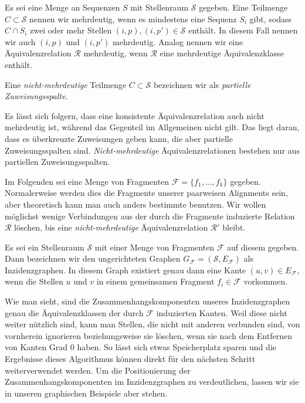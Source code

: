 \begin{definition}
	Es sei eine Menge an Sequenzen $S$ mit Stellenraum $\mathcal{S}$ gegeben. Eine Teilmenge $C \subset \mathcal{S}$ nennen wir mehrdeutig, wenn es mindestens eine Sequenz $S_i$ gibt, sodass $C \cap S_i$ zwei oder mehr Stellen $(i,p), (i,p') \in \mathcal{S}$ enthält. In diesem Fall nennen wir auch $(i,p)$ und $(i,p')$ mehrdeutig. Analog nennen wir eine Äquivalenzrelation $\mathcal{R}$ mehrdeutig, wenn $\mathcal{R}$ eine mehrdeutige Äquivalenzklasse enthält.
	
	Eine \emph{nicht-mehrdeutige} Teilmenge $C \subset \mathcal{S}$ bezeichnen wir als \emph{partielle Zuweisungsspalte}.
\end{definition}

Es lässt sich folgern, dass eine konsistente Äquivalenzrelation auch nicht mehrdeutig ist, während das Gegenteil im Allgemeinen nicht gilt. Das liegt daran, dass es überkreuzte Zuweisungen geben kann, die aber partielle Zuweisungsspalten sind. \emph{Nicht-mehrdeutige} Äquivalenzrelationen bestehen nur aus partiellen Zuweisungsspalten.

Im Folgenden sei eine Menge von Fragmenten $\mathcal{F} = \{f_1, \dots, f_k\}$ gegeben. Normalerweise werden dies die Fragmente unserer paarweisen Alignments sein, aber theoretisch kann man auch anders bestimmte benutzen. Wir wollen möglichst wenige Verbindungen aus der durch die Fragmente induzierte Relation $\mathcal{R}$ löschen, bis eine \emph{nicht-mehrdeutige} Äquivalenzrelation $\mathcal{R'}$ bleibt.

\begin{definition}[Inzidenzgraph]
	Es sei ein Stellenraum $\mathcal{S}$ mit einer Menge von Fragmenten $\mathcal{F}$ auf diesem gegeben. Dann bezeichnen wir den ungerichteten Graphen $G_{\mathcal{F}} = (\mathcal{S},E_{\mathcal{F}})$ als Inzidenzgraphen. In diesem Graph existiert genau dann eine Kante $(u,v) \in E_{\mathcal{F}}$, wenn die Stellen $u$ und $v$ in einem gemeinsamen Fragment $f_i \in \mathcal{F}$ vorkommen.
\end{definition} 

Wie man sieht, sind die Zusammenhangskomponenten unseres Inzidenzgraphen genau die Äquivalenzklassen der durch $\mathcal{F}$ induzierten Kanten. Weil diese nicht weiter nützlich sind, kann man Stellen, die nicht mit anderen verbunden sind, von vornherein ignorieren beziehungsweise sie löschen, wenn sie nach dem Entfernen von Kanten Grad 0 haben. So lässt sich etwas Speicherplatz sparen und die Ergebnisse dieses Algorithmus können direkt für den nächsten Schritt weiterverwendet werden. Um die Positionierung der Zusammenhangskomponenten im Inzidenzgraphen zu verdeutlichen, lassen wir sie in unseren graphischen Beispiele aber stehen.

